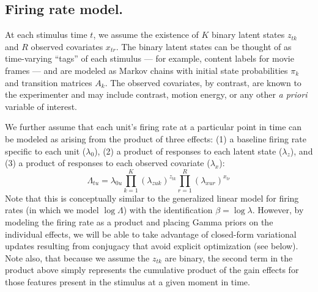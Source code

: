 \documentclass{nature}
\begin{document}
\subsection{Firing rate model.}
At each stimulus time $t$, we assume the existence of $K$ binary latent states $z_{tk}$ and $R$ observed covariates $x_{tr}$. The binary latent states can be thought of as time-varying ``tags'' of each stimulus --- for example, content labels for movie frames --- and are modeled as Markov chains with initial state probabilities $\pi_k$ and transition matrices $A_k$. The observed covariates, by contrast, are known to the experimenter and may include contrast, motion energy, or any other \emph{a priori} variable of interest.

We further assume that each unit's firing rate at a particular point in time can be modeled as arising from the product of three effects: (1) a baseline firing rate specific to each unit ($\lambda_0$), (2) a product of responses to each latent state ($\lambda_z$), and (3) a product of responses to each observed covariate ($\lambda_x$):
\begin{equation}
    \label{fr_model}
    \Lambda_{tu} = \lambda_{0u} \prod_{k = 1}^K (\lambda_{zuk})^{z_{tk}}
    \prod_{r = 1}^R (\lambda_{xur})^{x_{tr}}
\end{equation}
Note that this is conceptually similar to the generalized linear model for firing rates (in which we model $\log \Lambda$) with the identification $\beta = \log \lambda$. However, by modeling the firing rate as a product and placing Gamma priors on the individual effects, we will be able to take advantage of closed-form variational updates resulting from conjugacy that avoid explicit optimization (see below). Note also, that because we assume the $z_{tk}$ are binary, the second term in the product above simply represents the cumulative product of the gain effects for those features present in the stimulus at a given moment in time.
\end{document}
